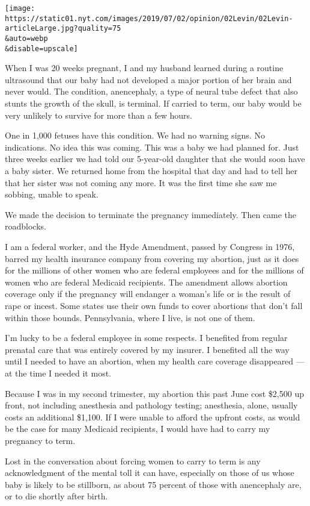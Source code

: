 \texttt{[image: https://static01.nyt.com/images/2019/07/02/opinion/02Levin/02Levin-articleLarge.jpg?quality=75\\\&auto=webp\\\&disable=upscale]}

When I was 20 weeks pregnant, I and my husband learned during a routine
ultrasound that our baby had not developed a major portion of her brain
and never would. The condition, anencephaly, a type of neural tube
defect that also stunts the growth of the skull, is terminal. If carried
to term, our baby would be very unlikely to survive for more than a few
hours.

One in 1,000 fetuses have this condition. We had no warning signs. No
indications. No idea this was coming. This was a baby we had planned
for. Just three weeks earlier we had told our 5-year-old daughter that
she would soon have a baby sister. We returned home from the hospital
that day and had to tell her that her sister was not coming any more. It
was the first time she saw me sobbing, unable to speak.

We made the decision to terminate the pregnancy immediately. Then came
the roadblocks.

I am a federal worker, and the Hyde Amendment, passed by Congress in
1976, barred my health insurance company from covering my abortion, just
as it does for the millions of other women who are federal employees and
for the millions of women who are federal Medicaid recipients. The
amendment allows abortion coverage only if the pregnancy will endanger a
woman's life or is the result of rape or incest. Some states use their
own funds to cover abortions that don't fall within those bounds.
Pennsylvania, where I live, is not one of them.

I'm lucky to be a federal employee in some respects. I benefited from
regular prenatal care that was entirely covered by my insurer. I
benefited all the way until I needed to have an abortion, when my health
care coverage disappeared --- at the time I needed it most.

Because I was in my second trimester, my abortion this past June cost
\$2,500 up front, not including anesthesia and pathology testing;
anesthesia, alone, usually costs an additional \$1,100. If I were unable
to afford the upfront costs, as would be the case for many Medicaid
recipients, I would have had to carry my pregnancy to term.

Lost in the conversation about forcing women to carry to term is any
acknowledgment of the mental toll it can have, especially on those of us
whose baby is likely to be stillborn, as about 75 percent of those with
anencephaly are, or to die shortly after birth.

